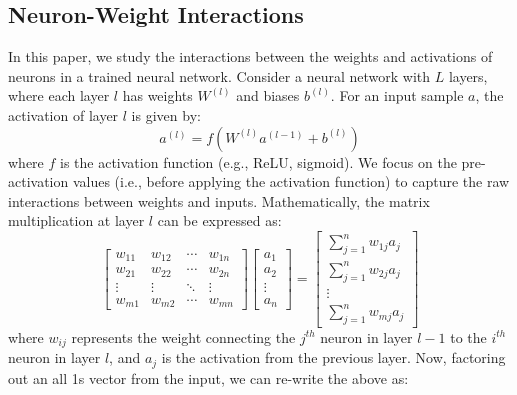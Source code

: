 \documentclass{article}
\begin{document}
        \subsection{Neuron-Weight Interactions}
            In this paper, we study the interactions between the weights and activations of neurons in a trained neural network. Consider a neural network with $L$ layers, where each layer $l$ has weights $W^{(l)}$ and biases $b^{(l)}$. For an input sample $a$, the activation of layer $l$ is given by: 
            \[a^{(l)} = f(W^{(l)} a^{(l-1)} + b^{(l)})\] 
            where $f$ is the activation function (e.g., ReLU, sigmoid). We focus on the pre-activation values (i.e., before applying the activation function) to capture the raw interactions between weights and inputs. Mathematically, the matrix multiplication at layer $l$ can be expressed as:
            \[
            \begin{bmatrix}
                    w_{11} & w_{12} & \cdots & w_{1n} \\
                    w_{21} & w_{22} & \cdots & w_{2n} \\
                    \vdots & \vdots & \ddots & \vdots \\
                    w_{m1} & w_{m2} & \cdots & w_{mn}
                \end{bmatrix}
                \begin{bmatrix}
                    a_{1} \\
                    a_{2} \\
                    \vdots \\
                    a_{n}
                \end{bmatrix}
                =
                \begin{bmatrix}
                    \sum_{j=1}^{n} w_{1j} a_{j} \\
                    \sum_{j=1}^{n} w_{2j} a_{j} \\
                    \vdots \\
                    \sum_{j=1}^{n} w_{mj} a_{j}
            \end{bmatrix} 
            \]
            where $w_{ij}$ represents the weight connecting the $j^{th}$ neuron in layer $l-1$ to the $i^{th}$ neuron in layer $l$, and $a_j$ is the activation from the previous layer. Now, factoring out an all 1s vector from the input, we can re-write the above as:
\end{document}
